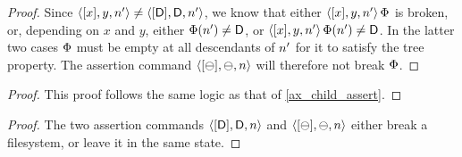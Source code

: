 \begin{myaxproof}
\axaxchildassert
\end{myaxproof}

\begin{proof}
Since $\langle{[x],y,n'}\rangle\neq\langle{[\mathsf{D}],\mathsf{D},n'}\rangle$, we know that
either $\langle{[x],y,n'}\rangle\,\Phi$ is broken, or, depending on $x$ and $y$,
either $\Phi(n')\neq\mathsf{D}$, or $\langle{[x],y,n'}\rangle\,\Phi(n')\neq\mathsf{D}$.
In the latter two cases $\Phi$ must be empty at all descendants of $n'$
for it to satisfy the tree property.
The assertion command $\langle{[\ominus],\ominus,n}\rangle$ will therefore not break $\Phi$.
\end{proof}

\begin{myaxproof}
\axaxparentassert
\end{myaxproof}

\begin{proof}
This proof follows the same logic as that of \cref{ax_child_assert}.
\end{proof}

\begin{myaxproof}
\axaxassert
\end{myaxproof}

\begin{proof}
The two assertion commands $\langle{[\mathsf{D}],\mathsf{D},n}\rangle$ and $\langle{[\ominus],\ominus,n}\rangle$ either
break a filesystem, or leave it in the same state.
\end{proof}
